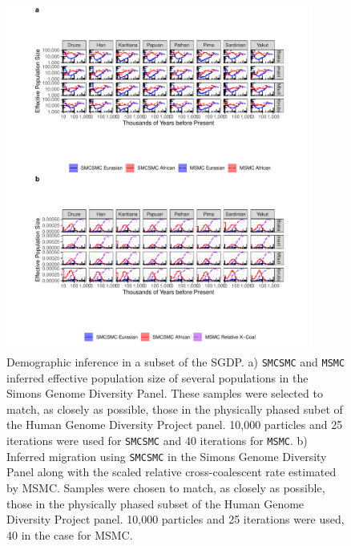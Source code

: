 \documentclass{article}
\begin{document}
\begin{figure}
    \centering
    \includegraphics[width=0.9\textwidth]{plot/subset_ne_mig.pdf}
    \caption{Demographic inference in a subset of the SGDP. a) {\tt SMCSMC} and {\tt MSMC} inferred effective population size of several populations in the Simons Genome Diversity Panel. These samples were selected to match, as closely as possible, those in the physically phased subet of the Human Genome Diversity Project panel. 10,000 particles and 25 iterations were used for {\tt SMCSMC} and 40 iterations for {\tt MSMC}. b) Inferred migration using {\tt SMCSMC} in the Simons Genome Diversity Panel along with the scaled relative cross-coalescent rate estimated by MSMC. Samples were chosen to match, as closely as possible, those in the physically phased subset of the Human Genome Diversity Project panel. 10,000 particles and 25 iterations were used, 40 in the case for MSMC.}
    \label{fig:hgdp_sgdp}
\end{figure}
\end{document}

